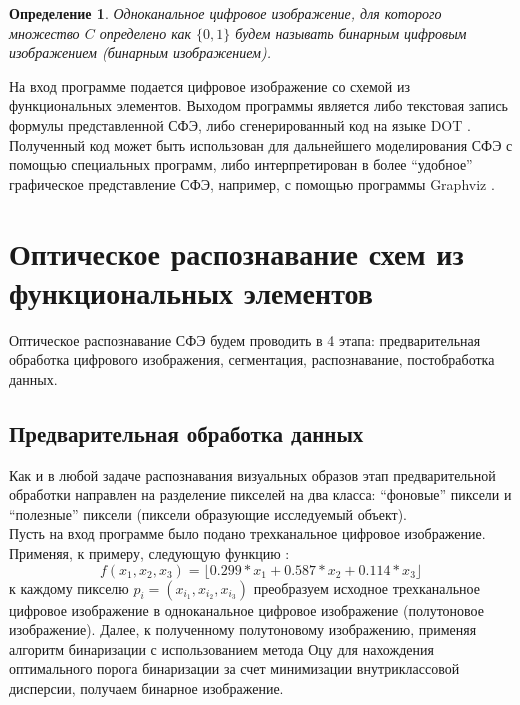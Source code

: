 \documentclass[makeidx, a4paper, 14pt]{extarticle}
\newtheorem{definition}{Определение}
\begin{document}
\begin{definition}
    Одноканальное цифровое изображение, для которого множество $C$ определено как ${\{0, 1\}}$ будем называть бинарным цифровым изображением (бинарным изображением).
\end{definition}

На вход программе подается цифровое изображение со схемой из функциональных элементов. Выходом программы является либо текстовая
запись формулы представленной СФЭ, либо сгенерированный код на языке DOT \cite{dot_lang}. Полученный код может быть использован для дальнейшего моделирования СФЭ с помощью специальных программ, либо интерпретирован в более ``удобное''
графическое представление СФЭ, например, с помощью программы Graphviz \cite{graphviz}.

\section{Оптическое распознавание схем из функциональных элементов}

Оптическое распознавание СФЭ будем проводить в 4 этапа: предварительная обработка цифрового изображения, сегментация, распознавание, постобработка данных.

\subsection{Предварительная обработка данных}

Как и в любой задаче распознавания визуальных образов этап предварительной обработки направлен на разделение пикселей на два класса: ``фоновые'' пиксели и ``полезные'' пиксели
(пиксели образующие исследуемый объект). \\

Пусть на вход программе было подано трехканальное цифровое изображение. Применяя, к примеру, следующую функцию \cite{grayscale_luma}:
\[ f(x_1, x_2, x_3) = \lfloor 0.299 * x_1 + 0.587 * x_2 + 0.114 * x_3 \rfloor \] к каждому пикселю
$p_i=({x_{i_1}}, {x_{i_2}}, {x_{i_3}})$ преобразуем исходное трехканальное цифровое изображение в одноканальное цифровое изображение (полутоновое изображение).
Далее, к полученному полутоновому изображению, применяя алгоритм бинаризации с использованием метода Оцу \cite{otsu79} для нахождения оптимального порога бинаризации за счет
минимизации внутриклассовой дисперсии, получаем бинарное изображение.
\end{document}
